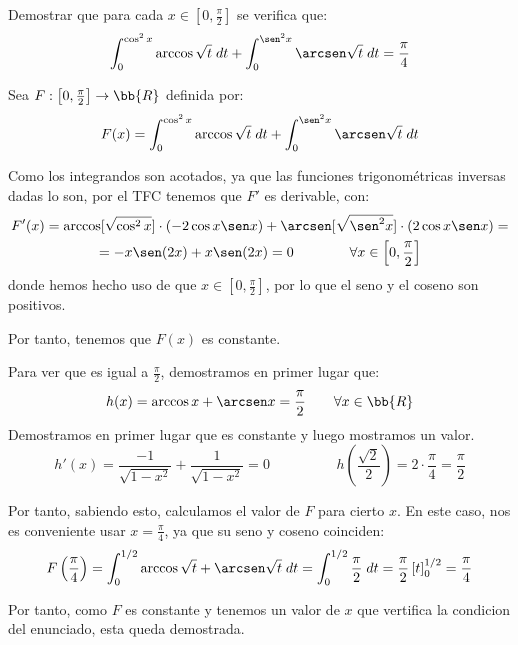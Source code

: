 \begin{ejercicio}
    Demostrar que para cada $x\in \left[0, \frac{\pi}{2} \right]$ se verifica que:
    \begin{equation*}
        \int_0^{\cos^2 x} \arccos{\sqrt{t}}\; dt + \int_0^{\sen^2 x} \arcsen\sqrt{t}\;dt =\frac{\pi}{4}
    \end{equation*}

    Sea $F:\left[0,\frac{\pi}{2}\right]\to \bb{R}$ definida por:
    \begin{equation*}
        F(x)=\int_0^{\cos^2 x} \arccos{\sqrt{t}}\; dt + \int_0^{\sen^2 x} \arcsen\sqrt{t}\;dt
    \end{equation*}

    Como los integrandos son acotados, ya que las funciones trigonométricas inversas dadas lo son, por el TFC tenemos que $F'$ es derivable, con:
    \begin{multline*}
        F'(x)=\arccos[\sqrt{\cos^2 x}] \cdot (-2\cos x\sen x) + \arcsen[\sqrt{\sen^2 x}] \cdot (2\cos x\sen x) =\\
        = -x\sen(2x) +x\sen(2x) = 0 \qquad \qquad \forall x\in \left[0,\frac{\pi}{2}\right]
    \end{multline*}
    donde hemos hecho uso de que $x\in \left[0,\frac{\pi}{2}\right]$, por lo que el seno y el coseno son positivos.

    Por tanto, tenemos que $F(x)$ es constante. 
    
    
    Para ver que es igual a $\frac{\pi}{2}$, demostramos en primer lugar que: $$h(x)=\arccos x + \arcsen x = \frac{\pi}{2} \qquad \forall x\in \bb{R}$$
    Demostramos en primer lugar que es constante y luego mostramos un valor.
    \begin{equation*}
        h'(x)=\frac{-1}{\sqrt{1-x^2}} + \frac{1}{\sqrt{1-x^2}} = 0  \hspace{2cm} h\left(\frac{\sqrt{2}}{2}\right)=2\cdot \frac{\pi}{4} = \frac{\pi}{2}
    \end{equation*}

    Por tanto, sabiendo esto, calculamos el valor de $F$ para cierto $x$. En este caso, nos es conveniente usar $x=\frac{\pi}{4}$, ya que su seno y coseno coinciden:
    \begin{equation*}
        F\left(\frac{\pi}{4}\right) = \int_0^{1/2} \arccos{\sqrt{t}} + \arcsen\sqrt{t}\;dt = \int_0^{1/2} \frac{\pi}{2}\;dt = \frac{\pi}{2}\left[t\right]_0^{1/2} = \frac{\pi}{4}
    \end{equation*}

    Por tanto, como $F$ es constante y tenemos un valor de $x$ que vertifica la condicion del enunciado, esta queda demostrada.
\end{ejercicio}